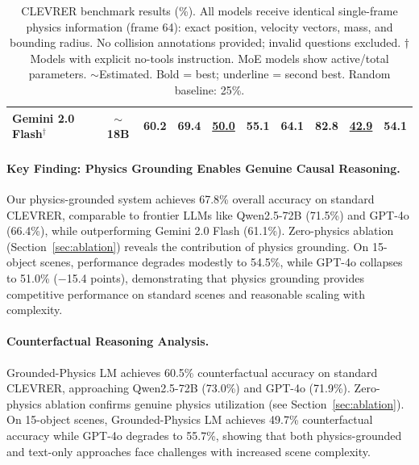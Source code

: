 \documentclass[conference]{IEEEtran}
\theoremstyle{plain}
\theoremstyle{definition}
\theoremstyle{remark}
\begin{document}
\begin{table}[t]
\begin{tabular*}{\textwidth}{@{\extracolsep{\fill}}lccccccccc@{}}
Gemini 2.0 Flash$^\dagger$ & $\sim$18B & 60.2 & 69.4 & \underline{50.0} & 55.1 & 64.1 & 82.8 & \underline{42.9} & 54.1 \\
\bottomrule
\end{tabular*}
\renewcommand{\arraystretch}{1.0}
\caption{CLEVRER benchmark results (\%). All models receive identical single-frame physics information (frame 64): exact position, velocity vectors, mass, and bounding radius. No collision annotations provided; invalid questions excluded. $\dagger$Models with explicit no-tools instruction. MoE models show active/total parameters. $\sim$Estimated. Bold = best; underline = second best. Random baseline: 25\%.}
\label{tab:main_results}
\end{table}

\paragraph{Key Finding: Physics Grounding Enables Genuine Causal Reasoning.} Our physics-grounded system achieves 67.8\% overall accuracy on standard CLEVRER, comparable to frontier LLMs like Qwen2.5-72B (71.5\%) and GPT-4o (66.4\%), while outperforming Gemini 2.0 Flash (61.1\%). Zero-physics ablation (Section~\ref{sec:ablation}) reveals the contribution of physics grounding. On 15-object scenes, performance degrades modestly to 54.5\%, while GPT-4o collapses to 51.0\% ($-$15.4 points), demonstrating that physics grounding provides competitive performance on standard scenes and reasonable scaling with complexity.

\paragraph{Counterfactual Reasoning Analysis.} Grounded-Physics LM achieves 60.5\% counterfactual accuracy on standard CLEVRER, approaching Qwen2.5-72B (73.0\%) and GPT-4o (71.9\%). Zero-physics ablation confirms genuine physics utilization (see Section~\ref{sec:ablation}). On 15-object scenes, Grounded-Physics LM achieves 49.7\% counterfactual accuracy while GPT-4o degrades to 55.7\%, showing that both physics-grounded and text-only approaches face challenges with increased scene complexity.
\end{document}
